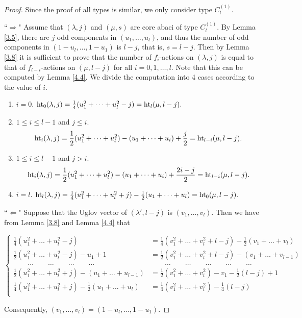 \documentclass[11pt]{amsart}
\theoremstyle{plain}
\numberwithin{equation}{subsection}
\newcommand{\lam}{\lambda}
\begin{document}
\begin{proof}
Since the proof of all types is similar, we only consider type $C_l^{(1)}$.

``$\Longrightarrow$"  Assume that $(\lam, j)$ and $(\mu, s)$ are core abaci of type $C_l^{(1)}$.
By Lemma \ref{3.5}, there are $j$ odd components in $(u_1, \dots, u_l)$, 
and thus the number of odd components in $(1-u_l, \dots, 1-u_1)$ is $l-j$, that is, $s=l-j$.
Then by Lemma \ref{3.8} it is sufficient to prove that the number of $f_i$-actions on $(\lam, j)$
is equal to that of $f_{l-i}$-actions on $(\mu, l-j)$ for all $i=0,1, \dots, l$. 
Note that this can be computed by Lemma \ref{4.4}. We divide the computation into 4 cases according to the value of $i$.
\begin{enumerate}
\item [\rm Case 1.] $i=0$. ${\rm ht}_0(\lam, j)=\frac{1}{4}(u_1^2+\dots+u_l^2-j)={\rm ht}_l(\mu, l-j).$

\smallskip

\item [\rm Case 2.] $1\leq i\leq l-1$ and $j\leq i$. $${\rm ht}_i(\lam, j)=\frac{1}{2}(u_1^2+\dots+u_l^2)-(u_1+\dots+u_i)+\frac{j}{2}={\rm ht}_{l-i}(\mu, l-j).$$
\item [\rm Case 3.] $1\leq i\leq l-1$ and $j>i$.
		$${\rm ht}_i(\lam, j)=\frac{1}{2}(u_1^2+\dots+u_l^2)-(u_1+\dots+u_i)+\frac{2i-j}{2}={\rm ht}_{l-i}(\mu, l-j).$$
\item [\rm Case 4.] $i=l$.
		${\rm ht}_l(\lam, j)=\frac{1}{4}(u_1^2+\dots+u_l^2+j)-\frac{1}{2}(u_1+\dots+u_l)={\rm ht}_0(\mu, l-j).$
\end{enumerate}

\smallskip

``$\Longleftarrow$" Suppose that the Uglov vector of $(\lam', l-j)$ is $(v_1, \dots, v_l)$.
Then we have from Lemma \ref{3.8} and Lemma \ref{4.4} that

\smallskip

\noindent$\begin{cases}
\frac{1}{4}(u_1^2+\dots+u_l^2-j)&=	\frac{1}{4}(v_1^2+\dots+v_l^2+l-j)-	\frac{1}{2}(v_1+\dots+v_l)\\
\frac{1}{2}(u_1^2+\dots+u_l^2-j)-u_1+1&=	\frac{1}{2}(v_1^2+\dots+v_l^2+l-j)-	(v_1+\dots+v_{l-1})\\
\quad\quad\dots\quad\quad\dots\quad\quad\dots\quad\quad\dots & \quad\quad\dots\quad\quad\dots\quad\quad\dots\quad\quad\dots\quad\quad\dots\\
\frac{1}{2}(u_1^2+\dots+u_l^2+j)-(u_1+\dots+u_{l-1})&=	\frac{1}{2}(v_1^2+\dots+v_l^2)-	v_1-\frac{1}{2}(l-j)+1\\
\frac{1}{4}(u_1^2+\dots+u_l^2+j)-\frac{1}{2}(u_1+\dots+u_l)&=\frac{1}{4}(v_1^2+\dots+v_l^2)-\frac{1}{4}(l-j)\\
\end{cases}$

\smallskip

\noindent Consequently, $(v_1, \dots, v_l)=(1-u_l, \dots, 1-u_1)$.
\end{proof}
\end{document}
